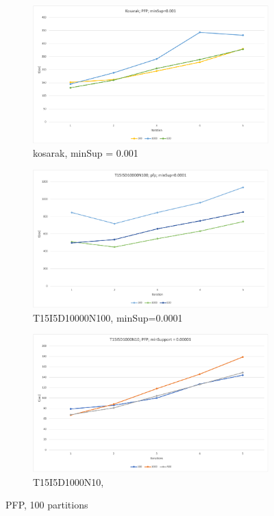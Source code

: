 \begin{figure}[H]
  \centering
  \begin{subfigure}{\textwidth}
  \centering
  \includegraphics[width=\linewidth]{figures/4iterations/kosarak_pfp_001}
  \caption{kosarak, minSup = 0.001}
  \label{fig:kosarak_pfp_001}
  \end{subfigure}
  \begin{subfigure}{\textwidth}
  \centering
  \includegraphics[width=\linewidth]{figures/4iterations/T15I5D10000N100_pfp_0001}
  \caption{T15I5D10000N100, minSup=0.0001}
  \label{fig:T15I5D10000N100_pfp_0001}
    \end{subfigure}
  \begin{subfigure}{\textwidth}
  \centering
  \includegraphics[width=\linewidth]{figures/4iterations/T15I5D1000N10_pfp_00001}
  \caption{T15I5D1000N10, }
  \label{fig:T15I5D1000N10_pfp_00001}
    \end{subfigure}
    \caption{PFP, 100 partitions}
\end{figure}


